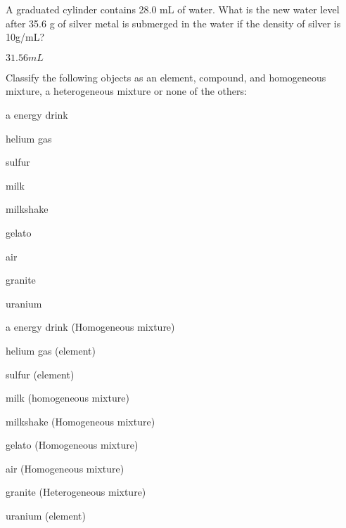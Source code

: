 \documentclass[main.tex]{subfiles}
\begin{document}
\begin{multicols*}{2}
\begin{question}[ID=\the\value{numA}]
A graduated cylinder contains 28.0 mL of water. What is the new water level after 35.6 g of silver metal is submerged in the water if the density of silver is 10g/mL?
\end{question}
\begin{solution}
$31.56mL$
\hspace{0.1cm}\end{solution}%
\begin{question}[ID=\the\value{numA}]
Classify the following objects as an element, compound, and homogeneous mixture, a heterogeneous mixture or none of the others:
\begin{inparaenum}[(a)]
  \item a energy drink %
  \item helium gas %
    \item sulfur %
  \item milk %
  \item milkshake %
    \item gelato %
    \item  air %
 \item  granite %
  \item uranium %
\end{inparaenum}
\end{question}
\begin{solution}
\begin{inparaenum}[(a)]
  \item a energy drink  (Homogeneous mixture)
  \item helium gas  (element)
    \item sulfur  (element)
  \item milk  (homogeneous mixture)
  \item milkshake  (Homogeneous mixture)
    \item gelato  (Homogeneous mixture)
    \item  air  (Homogeneous mixture)
 \item  granite  (Heterogeneous mixture)
  \item uranium  (element)
\end{inparaenum}\hspace{0.1cm}\end{solution}%


\end{multicols*}
\end{document}
